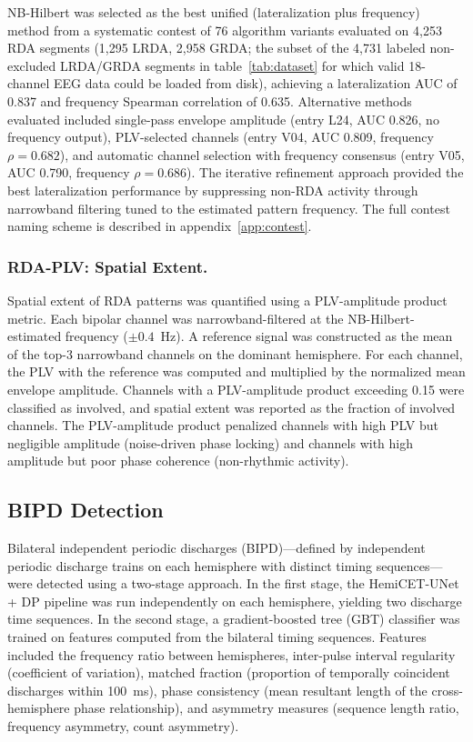 \documentclass{iopjournal}
\begin{document}
NB-Hilbert was selected as the best unified (lateralization plus frequency) method from a systematic contest of 76 algorithm variants evaluated on 4,253 RDA segments (1,295 LRDA, 2,958 GRDA; the subset of the 4,731 labeled non-excluded LRDA/GRDA segments in table~\ref{tab:dataset} for which valid 18-channel EEG data could be loaded from disk), achieving a lateralization AUC of 0.837 and frequency Spearman correlation of 0.635. Alternative methods evaluated included single-pass envelope amplitude (entry L24, AUC 0.826, no frequency output), PLV-selected channels (entry V04, AUC 0.809, frequency $\rho = 0.682$), and automatic channel selection with frequency consensus (entry V05, AUC 0.790, frequency $\rho = 0.686$). The iterative refinement approach provided the best lateralization performance by suppressing non-RDA activity through narrowband filtering tuned to the estimated pattern frequency. The full contest naming scheme is described in appendix~\ref{app:contest}.

\subsubsection{RDA-PLV: Spatial Extent.}

Spatial extent of RDA patterns was quantified using a PLV-amplitude product metric. Each bipolar channel was narrowband-filtered at the NB-Hilbert-estimated frequency ($\pm 0.4$~Hz). A reference signal was constructed as the mean of the top-3 narrowband channels on the dominant hemisphere. For each channel, the PLV with the reference was computed and multiplied by the normalized mean envelope amplitude. Channels with a PLV-amplitude product exceeding 0.15 were classified as involved, and spatial extent was reported as the fraction of involved channels. The PLV-amplitude product penalized channels with high PLV but negligible amplitude (noise-driven phase locking) and channels with high amplitude but poor phase coherence (non-rhythmic activity).

\subsection{BIPD Detection}
\label{sec:bipd}

Bilateral independent periodic discharges (BIPD)---defined by independent periodic discharge trains on each hemisphere with distinct timing sequences---were detected using a two-stage approach. In the first stage, the HemiCET-UNet + DP pipeline was run independently on each hemisphere, yielding two discharge time sequences. In the second stage, a gradient-boosted tree (GBT) classifier was trained on features computed from the bilateral timing sequences. Features included the frequency ratio between hemispheres, inter-pulse interval regularity (coefficient of variation), matched fraction (proportion of temporally coincident discharges within 100~ms), phase consistency (mean resultant length of the cross-hemisphere phase relationship), and asymmetry measures (sequence length ratio, frequency asymmetry, count asymmetry).
\end{document}
